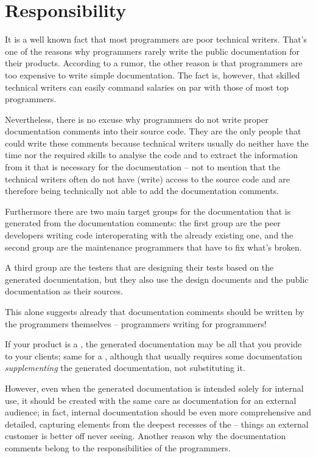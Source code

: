 \section{Responsibility} 
It is a well known fact that most programmers are poor technical writers. That's one of the reasons why programmers rarely write the public documentation for their products. According to a rumor, the other reason is that programmers are too expensive to write simple documentation. The fact is, however, that skilled technical writers can easily command salaries on par with those of most top programmers.

Nevertheless, there is no excuse why programmers do not write proper documentation comments into their source code. They are the only people that could write these comments because technical writers usually do neither have the time nor the required skills to analyse the code and to extract the information from it that is necessary for the documentation – not to mention that the technical writers often do not have (write) access to the source code and are therefore being technically not able to add the documentation comments.

Furthermore there are two main target groups for the documentation that is generated from the documentation comments: the first group are the peer developers writing code interoperating with the already existing one, and the second group are the maintenance programmers that have to fix what's broken.

A third group are the testers that are designing their tests based on the generated documentation, but they also use the design documents and the public documentation as their sources.

This alone suggests already that documentation comments should be written by the programmers themselves – programmers writing for programmers!

If your product is a , the generated documentation may be all that you provide to your clients; same for a , although that usually requires some documentation \textit{supplementing} the generated documentation, not substituting it.

However, even when the generated documentation is intended solely for internal use, it should be created with the same care as documentation for an external audience; in fact, internal documentation should be even more comprehensive and detailed, capturing elements from the deepest recesses of the  – things an external customer is better off never seeing. Another reason why the documentation comments belong to the responsibilities of the programmers.

